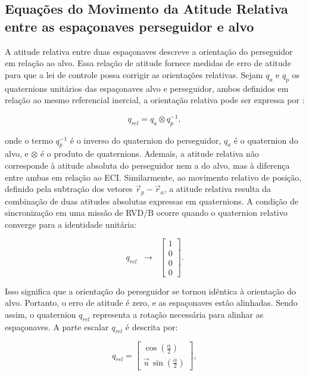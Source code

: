 \subsection{Equações do Movimento da Atitude Relativa entre as espaçonaves perseguidor e alvo}

A atitude relativa entre duas espaçonaves descreve a orientação do perseguidor em relação ao alvo.
Essa relação de atitude fornece medidas de erro de atitude para que a lei de controle possa corrigir as orientações relativas.
Sejam $q_a$ e $q_p$ os quaternions unitários das espaçonaves alvo e perseguidor, ambos definidos em relação ao mesmo referencial inercial, a orientação relativa pode ser expressa por \cite{na2019vision}:

\begin{equation}
    \label{eq:quat_relativo}
q_{rel}
=
q_a \otimes q_p^{-1},
\end{equation}

onde o termo $q_p^{-1}$ é o inverso do quaternion do perseguidor, $q_a$ é o quaternion do alvo, e $\otimes$ é o produto de quaternions.
Ademais, a atitude relativa não corresponde à atitude absoluta do perseguidor nem a do alvo, mas à diferença entre ambas em relação ao ECI. 
Similarmente, ao movimento relativo de posição, definido pela subtração dos vetores $\vec r_p - \vec r_a$, a atitude relativa resulta da combinação de duas atitudes absolutas expressas em quaternions. 
A condição de sincronização em uma missão de RVD/B ocorre quando o quaternion relativo converge para a identidade unitária:

\begin{equation}
\label{eq:qrel_sincronizacao}
q_{rel} \;\;\longrightarrow\;\; 
\begin{bmatrix}1 \\ 0 \\ 0 \\ 0\end{bmatrix}.
\end{equation}

Isso significa que a orientação do perseguidor se tornou idêntica à orientação do alvo. 
Portanto, o erro de atitude é zero, e as espaçonaves estão alinhadas.
Sendo assim, o quaternion $q_{rel}$ representa a rotação necessária para alinhar as espaçonaves.
A parte escalar $q_{rel}$ é descrita por:

\begin{equation}
q_{rel} =
\begin{bmatrix}
\cos\!\left(\tfrac{\alpha}{2}\right) \\[4pt]
\vec{u}\,\sin\!\left(\tfrac{\alpha}{2}\right)
\end{bmatrix},
\end{equation}

